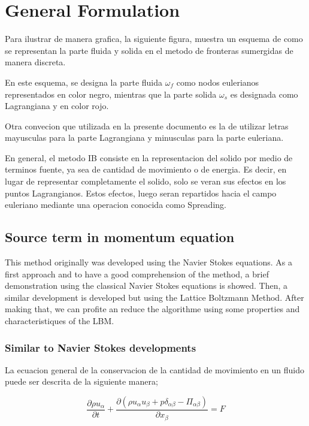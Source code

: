 \section{General Formulation}
Para ilustrar de manera grafica, la siguiente figura, muestra un esquema de como
se representan la parte fluida y solida en el metodo de fronteras sumergidas de
manera discreta.

En este esquema, se designa la parte fluida $\omega_f$ como nodos eulerianos
representados en color negro, mientras que la parte solida $\omega_s$ es
designada como Lagrangiana y en color rojo.  

Otra convecion que utilizada en la presente documento es la de utilizar letras
mayusculas para la parte Lagrangiana y minusculas para la parte euleriana.

En general, el metodo IB consiste en la representacion del solido por medio de
terminos fuente, ya sea de cantidad de movimiento o de energia. Es decir, en
lugar de representar completamente el solido, solo se veran sus efectos en los
puntos Lagrangianos. Estos efectos, luego seran repartidos hacia el campo
euleriano mediante una operacion conocida como Spreading.

\subsection{Source term in momentum equation}

This method originally was developed using the Navier Stokes equations. As a
first approach and to have a good comprehension of the method, a brief
demonstration using the classical Navier Stokes equations is showed. Then, a
similar development is developed but using the Lattice Boltzmann Method. After
making that, we can profite an reduce the algorithme using some properties and
characteristiques of the LBM.

\subsubsection{Similar to Navier Stokes developments}

La ecuacion general de la conservacion de la cantidad de movimiento en un fluido puede ser
descrita de la siguiente manera;

\begin{equation}
	\frac{\partial \rho u_\alpha}{\partial t} + \frac{ \partial(\rho u_\alpha u_\beta + p\delta_{\alpha\beta}-\Pi_{\alpha\beta})}{\partial x_\beta} = F
\end{equation}

